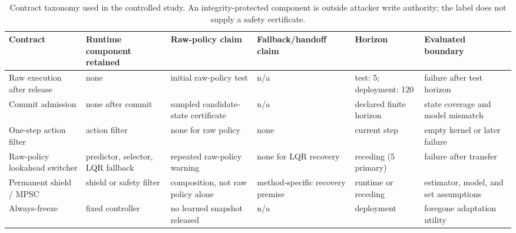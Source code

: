 \begin{table}[t]
\centering
\caption{Contract taxonomy used in the controlled study.  An
integrity-protected component is outside attacker write authority; the label
does not supply a safety certificate.}
\label{tab:contract-taxonomy}
\scriptsize
\setlength{\tabcolsep}{3pt}
\begin{tabular}{@{}L{0.14\textwidth}L{0.14\textwidth}L{0.18\textwidth}L{0.18\textwidth}L{0.13\textwidth}L{0.16\textwidth}@{}}
\toprule
Contract & Runtime component retained & Raw-policy claim & Fallback/handoff claim & Horizon & Evaluated boundary\\
\midrule
Raw execution after release & none & initial raw-policy test & n/a & test: 5; deployment: 120 & failure after test horizon\\
Commit admission & none after commit & sampled candidate-state certificate & n/a & declared finite horizon & state coverage and model mismatch\\
One-step action filter & action filter & none for raw policy & none & current step & empty kernel or later failure\\
Raw-policy lookahead switcher & predictor, selector, LQR fallback & repeated raw-policy warning & none for LQR recovery & receding (5 primary) & failure after transfer\\
Permanent shield / MPSC & shield or safety filter & composition, not raw policy alone & method-specific recovery premise & runtime or receding & estimator, model, and set assumptions\\
Always-freeze & fixed controller & no learned snapshot released & n/a & deployment & foregone adaptation utility\\
\bottomrule
\end{tabular}
\end{table}
